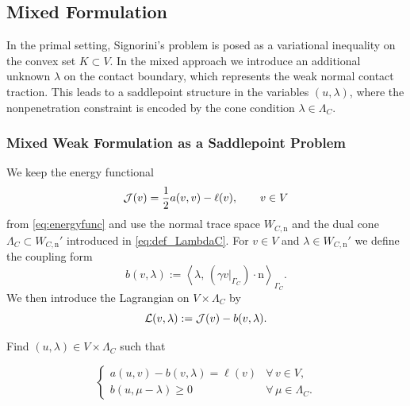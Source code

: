 \subsection{Mixed Formulation}

In the primal setting, Signorini's problem is posed as a variational inequality on the convex set $K\subset V$.
In the mixed approach we introduce an additional unknown $\lambda$ on the contact boundary, which represents the weak normal contact traction.
This leads to a saddlepoint structure in the variables $(u,\lambda)$, where the nonpenetration constraint is encoded by the cone condition $\lambda\in\Lambda_C$.

\subsubsection{Mixed Weak Formulation as a Saddlepoint Problem}

We keep the energy functional
\begin{equation*}
	{\mathcal J}(v)=\frac12 a(v,v)-\ell(v),\qquad v\in V
\end{equation*}
from \eqref{eq:energyfunc} and use the normal trace space $W_{C,\mathrm n}$ and the dual cone $\Lambda_C\subset W_{C,\mathrm n}'$ introduced in \eqref{eq:def_LambdaC}. For $v\in V$ and $\lambda\in W_{C,\mathrm n}'$ we define the coupling form
\begin{equation}\label{eq:def_b_mixed}
	b(v,\lambda):=\left\langle \lambda,\,(\gamma v|_{\Gamma_C})\cdot \mathrm n\right\rangle_{\Gamma_C}.
\end{equation}
We then introduce the Lagrangian on $V\times\Lambda_C$ by
\begin{equation}\label{eq:def_Lagrangian_mixed}
	{\mathcal L}(v,\lambda):={\mathcal J}(v)-b(v,\lambda).
\end{equation}

\begin{problem}\label{pr:signorini_mixed}
Find $(u,\lambda)\in V\times \Lambda_C$ such that

\begin{equation*}
	\begin{cases}
		a(u,v)-b(v,\lambda)=\ell(v) & \forall\,v\in V,           \\[3pt]
		b(u,\mu-\lambda)\ge 0       & \forall\,\mu\in \Lambda_C.
	\end{cases}
\end{equation*}
\end{problem}

